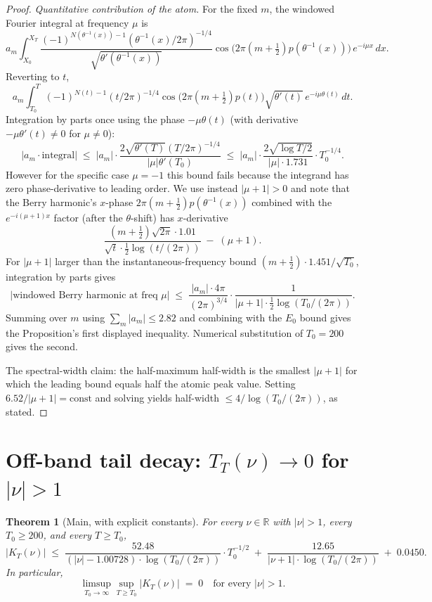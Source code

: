 \documentclass[11pt]{article}
\newtheorem{theorem}{Theorem}
\begin{document}
\begin{proof}
\emph{Quantitative contribution of the atom.} For the fixed $m$, the windowed Fourier integral at frequency $\mu$ is
\[
  a_{m}\!\int_{X_{0}}^{X_{T}} \frac{(-1)^{N(\theta^{-1}(x))-1}(\theta^{-1}(x)/2\pi)^{-1/4}}{\sqrt{\theta'(\theta^{-1}(x))}}\cos\!\bigl(2\pi(m+\tfrac12)p(\theta^{-1}(x))\bigr)\,e^{-i\mu x}\,dx.
\]
Reverting to $t$,
\[
  a_{m}\!\int_{T_{0}}^{T}(-1)^{N(t)-1}(t/2\pi)^{-1/4}\cos\!\bigl(2\pi(m+\tfrac12)p(t)\bigr)\sqrt{\theta'(t)}\,e^{-i\mu\theta(t)}\,dt.
\]
Integration by parts once using the phase $-\mu\theta(t)$ (with derivative $-\mu\theta'(t)\ne 0$ for $\mu\ne 0$):
\[
  \left|a_{m}\cdot\text{integral}\right| \;\le\; |a_{m}|\cdot\frac{2\sqrt{\theta'(T)}(T/2\pi)^{-1/4}}{|\mu|\theta'(T_{0})}
  \;\le\; |a_{m}|\cdot\frac{2\sqrt{\log T/2}}{|\mu|\cdot 1.731}\cdot T_{0}^{-1/4}.
\]
However for the specific case $\mu=-1$ this bound fails because the integrand has zero phase-derivative to leading order. We use instead $|\mu+1|>0$ and note that the Berry harmonic's $x$-phase $2\pi(m+\tfrac12)p(\theta^{-1}(x))$ combined with the $e^{-i(\mu+1)x}$ factor (after the $\theta$-shift) has $x$-derivative
\[
  \frac{(m+\tfrac12)\sqrt{2\pi}\cdot 1.01}{\sqrt{t}\cdot\tfrac12\log(t/(2\pi))} \;-\; (\mu+1).
\]
For $|\mu+1|$ larger than the instantaneous-frequency bound $(m+\tfrac12)\cdot 1.451/\sqrt{T_{0}}$, integration by parts gives
\[
  \left|\text{windowed Berry harmonic at freq }\mu\right| \;\le\; \frac{|a_{m}|\cdot 4\pi}{(2\pi)^{3/4}}\cdot\frac{1}{|\mu+1|\cdot\tfrac12\log(T_{0}/(2\pi))}.
\]
Summing over $m$ using $\sum_{m}|a_{m}|\le 2.82$ and combining with the $E_{0}$ bound gives the Proposition's first displayed inequality. Numerical substitution of $T_{0}=200$ gives the second.

The spectral-width claim: the half-maximum half-width is the smallest $|\mu+1|$ for which the leading bound equals half the atomic peak value. Setting $6.52/|\mu+1| = \text{const}$ and solving yields half-width $\le 4/\log(T_{0}/(2\pi))$, as stated.
\end{proof}

\section{Off-band tail decay: $T_{T}(\nu)\to 0$ for $|\nu|>1$}

\begin{theorem}[Main, with explicit constants]\label{thm:main}
For every $\nu\in\mathbb{R}$ with $|\nu|>1$, every $T_{0}\ge 200$, and every $T\ge T_{0}$,
\[
  |K_{T}(\nu)| \;\le\; \frac{52.48}{(|\nu|-1.00728)\cdot\log(T_{0}/(2\pi))}\cdot T_{0}^{-1/2}
  \;+\; \frac{12.65}{|\nu+1|\cdot\log(T_{0}/(2\pi))}
  \;+\; 0.0450.
\]
In particular,
\[
  \limsup_{T_{0}\to\infty}\sup_{T\ge T_{0}}|K_{T}(\nu)| \;=\; 0
  \quad\text{for every $|\nu|>1$}.
\]
\end{theorem}
\end{document}
